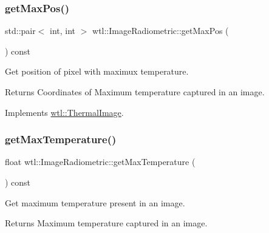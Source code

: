 \subsubsection{\texorpdfstring{get\+Max\+Pos()}{getMaxPos()}}
{\footnotesize\ttfamily std\+::pair$<$ int, int $>$ wtl\+::\+Image\+Radiometric\+::get\+Max\+Pos (\begin{DoxyParamCaption}{ }\end{DoxyParamCaption}) const\hspace{0.3cm}{\ttfamily [virtual]}}



Get position of pixel with maximux temperature. 

\begin{DoxyReturn}{Returns}
Coordinates of Maximum temperature captured in an image. 
\end{DoxyReturn}


Implements \hyperlink{classwtl_1_1_thermal_image_af5c649f864be43c3f0f4f9bacc047345}{wtl\+::\+Thermal\+Image}.

\mbox{\label{classwtl_1_1_image_radiometric_a2d1922ffa3030f0344a7e1abf90a524d}} 
\subsubsection{\texorpdfstring{get\+Max\+Temperature()}{getMaxTemperature()}}
{\footnotesize\ttfamily float wtl\+::\+Image\+Radiometric\+::get\+Max\+Temperature (\begin{DoxyParamCaption}{ }\end{DoxyParamCaption}) const}



Get maximum temperature present in an image. 

\begin{DoxyReturn}{Returns}
Maximum temperature captured in an image. 
\end{DoxyReturn}
\mbox{\label{classwtl_1_1_image_radiometric_a906c58c168250da7412d53626f34aba1}} 
